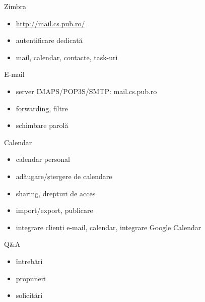 \documentclass{simple}
\begin{document}
\begin{frame}{Zimbra}
  \begin{itemize}
    \item \url{http://mail.cs.pub.ro/}
    \item autentificare dedicată
    \item mail, calendar, contacte, task-uri
  \end{itemize}
\end{frame}

\begin{frame}{E-mail}
  \begin{itemize}
    \item server IMAPS/POP3S/SMTP: mail.cs.pub.ro
    \item forwarding, filtre
    \item schimbare parolă
  \end{itemize}
\end{frame}

\begin{frame}{Calendar}
  \begin{itemize}
    \item calendar personal
    \item adăugare/ștergere de calendare
    \item sharing, drepturi de acces
    \item import/export, publicare
    \item integrare clienți e-mail, calendar, integrare Google Calendar
  \end{itemize}
\end{frame}

\begin{frame}{Q\&A}
  \begin{itemize}
    \item întrebări
    \item propuneri
    \item solicitări
  \end{itemize}
\end{frame}
\end{document}
